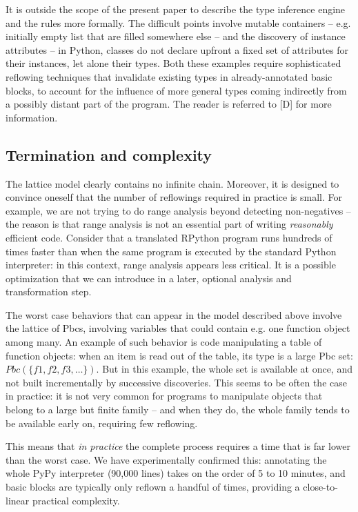 \documentclass{acm_proc_article-sp}
\begin{document}
It is outside the scope of the present paper to describe the type
inference engine and the rules more formally.  The difficult points
involve mutable containers -- e.g. initially empty list that are filled
somewhere else -- and the discovery of instance attributes -- in Python,
classes do not declare upfront a fixed set of attributes for their
instances, let alone their types.  Both these examples require
sophisticated reflowing techniques that invalidate existing types in
already-annotated basic blocks, to account for the influence of more
general types coming indirectly from a possibly distant part of the
program.  The reader is referred to [D] for more information.


\subsection{Termination and complexity}

The lattice model clearly contains no infinite chain.  Moreover, it is
designed to convince oneself that the number of reflowings required in
practice is small.  For example, we are not trying to do range analysis
beyond detecting non-negatives -- the reason is that range analysis is
not an essential part of writing \textit{reasonably} efficient code.  Consider
that a translated RPython program runs hundreds of times faster than
when the same program is executed by the standard Python interpreter: in
this context, range analysis appears less critical.  It is a possible
optimization that we can introduce in a later, optional analysis and
transformation step.

The worst case behaviors that can appear in the model described above
involve the lattice of Pbcs, involving variables that could contain
e.g.  one function object among many.  An example of such behavior is
code manipulating a table of function objects: when an item is read
out of the table, its type is a large Pbc set: $Pbc(\{f1, f2, f3,
\ldots\})$.  But in this example, the whole set is available at once,
and not built incrementally by successive discoveries.  This seems to
be often the case in practice: it is not very common for programs to
manipulate objects that belong to a large but finite family -- and when
they do, the whole family tends to be available early on, requiring
few reflowing.

This means that \textit{in practice} the complete process requires a time that
is far lower than the worst case.  We have experimentally confirmed
this: annotating the whole PyPy interpreter (90,000 lines) takes on the
order of 5 to 10 minutes, and basic blocks are typically only reflown a
handful of times, providing a close-to-linear practical complexity.
\end{document}
